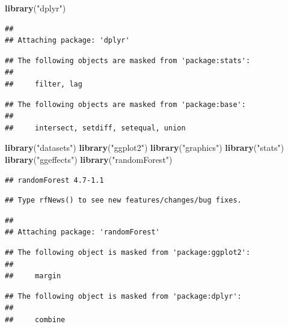 \documentclass[
]{article}
\newenvironment{Shaded}{\begin{snugshade}}{\end{snugshade}}
\newcommand{\FunctionTok}[1]{\textcolor[rgb]{0.13,0.29,0.53}{\textbf{#1}}}
\newcommand{\NormalTok}[1]{#1}
\newcommand{\StringTok}[1]{\textcolor[rgb]{0.31,0.60,0.02}{#1}}
\begin{document}
\begin{Shaded}
\begin{Highlighting}[]
\FunctionTok{library}\NormalTok{(}\StringTok{"dplyr"}\NormalTok{)}
\end{Highlighting}
\end{Shaded}

\begin{verbatim}
## 
## Attaching package: 'dplyr'
\end{verbatim}

\begin{verbatim}
## The following objects are masked from 'package:stats':
## 
##     filter, lag
\end{verbatim}

\begin{verbatim}
## The following objects are masked from 'package:base':
## 
##     intersect, setdiff, setequal, union
\end{verbatim}

\begin{Shaded}
\begin{Highlighting}[]
\FunctionTok{library}\NormalTok{(}\StringTok{"datasets"}\NormalTok{)}
\FunctionTok{library}\NormalTok{(}\StringTok{"ggplot2"}\NormalTok{)}
\FunctionTok{library}\NormalTok{(}\StringTok{"graphics"}\NormalTok{)}
\FunctionTok{library}\NormalTok{(}\StringTok{"stats"}\NormalTok{)}
\FunctionTok{library}\NormalTok{(}\StringTok{"ggeffects"}\NormalTok{)}
\FunctionTok{library}\NormalTok{(}\StringTok{"randomForest"}\NormalTok{)}
\end{Highlighting}
\end{Shaded}

\begin{verbatim}
## randomForest 4.7-1.1
\end{verbatim}

\begin{verbatim}
## Type rfNews() to see new features/changes/bug fixes.
\end{verbatim}

\begin{verbatim}
## 
## Attaching package: 'randomForest'
\end{verbatim}

\begin{verbatim}
## The following object is masked from 'package:ggplot2':
## 
##     margin
\end{verbatim}

\begin{verbatim}
## The following object is masked from 'package:dplyr':
## 
##     combine
\end{verbatim}
\end{document}
